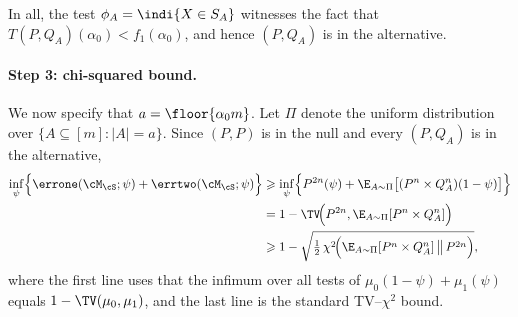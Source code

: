 \documentclass[english]{article}
\theoremstyle{plain}
\theoremstyle{definition}
\newcommand{\Toff}[2]{T(#1,#2)}
\newcommand{\falt}{f_1}
\begin{document}
In all, the test $\phi_A=\indi\{X\in S_A\}$ witnesses the fact that 
$\Toff{P}{Q_A}(\alpha_0)< \falt(\alpha_0)$, and hence $(P,Q_A)$ is in the alternative. 


\paragraph{Step 3: chi-squared bound.}
We now specify that $a = \floor{\alpha_0 m}$. Let $\Pi$ denote the uniform distribution over
$\{A \subseteq [m] : |A| = a\}$. Since $(P,P)$ is in the null
and every $(P, Q_A)$ is in the alternative,
\begin{align}
\label{eq:vc-testing-lb}
\inf_\psi \Bigl\{\errone(\cM_\cS;\psi)
+ \errtwo(\cM_\cS;\psi)\Bigr\}
&\geqslant \inf_\psi \Bigl\{
P^{2n}( \psi)
+ \E_{A \sim \Pi}\bigl[(P^n \times Q_A^n)(1-\psi)\bigr]
\Bigr\} \nonumber\\
&= 1 - \TV\!\Bigl(P^{2n},
\E_{A \sim \Pi}[P^n \times Q_A^n]\Bigr) \nonumber\\
&\geqslant 1 - \sqrt{\tfrac12\,
\chi^2\!\Bigl(\E_{A \sim \Pi}[P^n \times Q_A^n] \,\big\|\, P^{2n}\Bigr)},
\end{align}
where the first line uses that the infimum over all tests of
$\mu_0(1-\psi) + \mu_1(\psi)$ equals $1 - \TV(\mu_0,\mu_1)$, and
the last line is the standard TV--$\chi^2$ bound.
\end{document}
